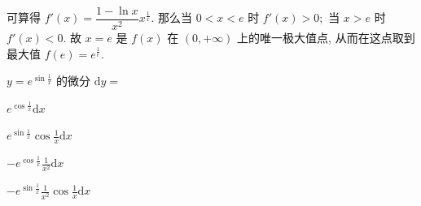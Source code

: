 \begin{solution}
可算得 $\displaystyle f'(x) = \dfrac{1 - \ln x}{x^2} x^{\frac{1}{x}}.$ 那么当 $0 < x < e$ 时 $f'(x) > 0;$ 当 $x > e$ 时 $f'(x) < 0.$ 故 $x = e$ 是 $f(x)$ 在 $(0, +\infty)$ 上的唯一极大值点, 从而在这点取到最大值 $f(e) = e^{\frac{1}{e}}.$
\end{solution}








\begin{question}
$y = e^{\sin \frac{1}{x}}$ 的微分 $\mathrm{d} y =$ \paren[D]

\begin{choices}
\item $e^{\cos \frac{1}{x}} \mathrm{d} x$
\item $e^{\sin \frac{1}{x}} \cos \frac{1}{x} \mathrm{d} x$
\item $-e^{\cos \frac{1}{x}} \frac{1}{x^2} \mathrm{d} x$
\item $-e^{\sin \frac{1}{x}} \frac{1}{x^2} \cos \frac{1}{x} \mathrm{d} x$
\end{choices}
\end{question}

